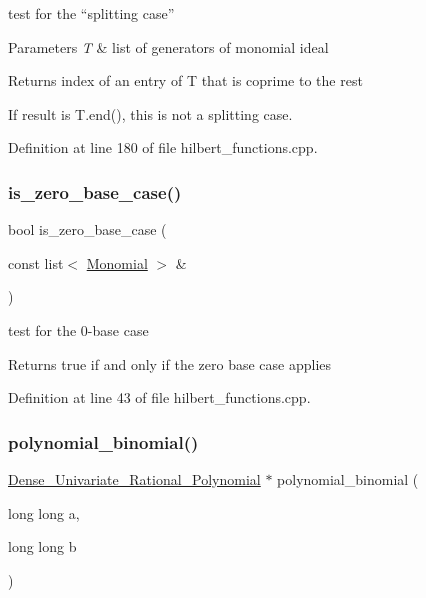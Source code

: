 test for the ``splitting case'' \cite{Bigatti97} 


\begin{DoxyParams}{Parameters}
{\em T} & list of generators of monomial ideal \\
\hline
\end{DoxyParams}
\begin{DoxyReturn}{Returns}
index of an entry of {\ttfamily T} that is coprime to the rest
\end{DoxyReturn}
If result is {\ttfamily T.\+end()}, this is not a splitting case. 

Definition at line 180 of file hilbert\+\_\+functions.\+cpp.

\mbox{\label{group__commalg_gabf201296cecf6c31675c7e23bb58dbb4}} 
\subsubsection{\texorpdfstring{is\+\_\+zero\+\_\+base\+\_\+case()}{is\_zero\_base\_case()}}
{\footnotesize\ttfamily bool is\+\_\+zero\+\_\+base\+\_\+case (\begin{DoxyParamCaption}\item[{const list$<$ \hyperlink{group__polygroup_class_monomial}{Monomial} $>$ \&}]{ }\end{DoxyParamCaption})}



test for the 0-\/base case \cite{Bigatti97} 

\begin{DoxyReturn}{Returns}
{\ttfamily true} if and only if the zero base case applies 
\end{DoxyReturn}


Definition at line 43 of file hilbert\+\_\+functions.\+cpp.

\mbox{\label{group__commalg_gab38a72ec7f6b744df95fd4a3058bafcb}} 
\subsubsection{\texorpdfstring{polynomial\+\_\+binomial()}{polynomial\_binomial()}}
{\footnotesize\ttfamily \hyperlink{group__polygroup_class_dense___univariate___rational___polynomial}{Dense\+\_\+\+Univariate\+\_\+\+Rational\+\_\+\+Polynomial} $\ast$ polynomial\+\_\+binomial (\begin{DoxyParamCaption}\item[{long long}]{a,  }\item[{long long}]{b }\end{DoxyParamCaption})}




